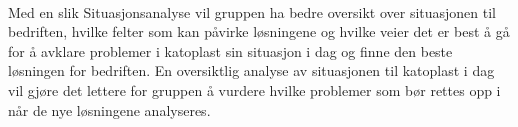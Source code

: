 \paragraph{} Med en slik Situasjonsanalyse vil gruppen ha bedre oversikt over situasjonen til bedriften, hvilke felter som kan påvirke løsningene og hvilke veier det er best å gå for å avklare problemer i katoplast sin situasjon i dag og finne den beste løsningen for bedriften. En oversiktlig analyse av situasjonen til katoplast i dag vil gjøre det lettere for gruppen å vurdere hvilke problemer som bør rettes opp i når de nye løsningene analyseres.

%
%


